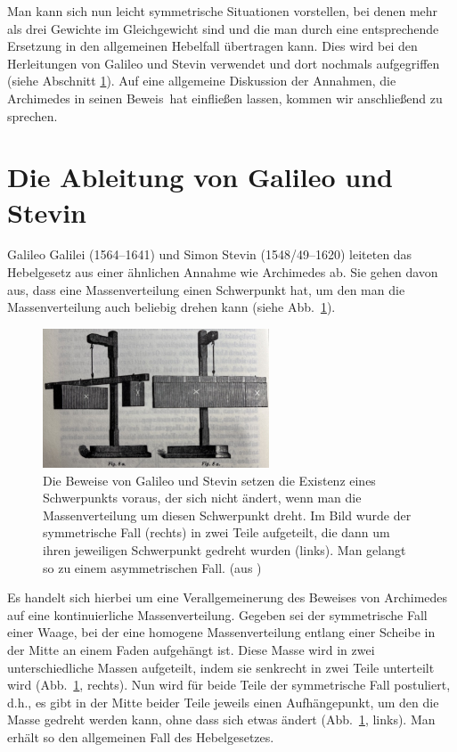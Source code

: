 Man kann sich nun leicht symmetrische Situationen vorstellen, bei denen mehr als
drei Gewichte im Gleichgewicht sind und die man durch eine entsprechende
Ersetzung in den allgemeinen Hebelfall \"ubertragen kann. Dies wird bei den
Herleitungen von Galileo und Stevin verwendet und dort nochmals aufgegriffen
(siehe Abschnitt \ref{sec_Hebel_G}). Auf eine allgemeine Diskussion der Annahmen,
die Archimedes in seinen \glqq Beweis\grqq\ hat einflie\ss en lassen, kommen wir
anschlie\ss end zu sprechen.

\section{Die Ableitung von Galileo und Stevin}
\label{sec_Hebel_G}

Galileo Galilei (1564--1641) 
und Simon Stevin (1548/49--1620) leiteten das
Hebelgesetz aus einer \"ahnlichen Annahme wie Archimedes ab. Sie gehen
davon aus, dass eine Massenverteilung einen Schwerpunkt hat, um den man
die Massenverteilung auch beliebig drehen kann (siehe Abb.\ \ref{fig_Mach}). 

\begin{figure}
\includegraphics[width=0.6\textwidth]{./Bilder/Mach.jpg}
\caption{\label{fig_Mach}%
Die Beweise von Galileo und Stevin setzen die Existenz eines Schwerpunkts voraus,
der sich nicht \"andert, wenn man die Massenverteilung um diesen Schwerpunkt
dreht. Im Bild wurde der symmetrische Fall (rechts) in zwei Teile aufgeteilt, die dann um 
ihren jeweiligen Schwerpunkt gedreht wurden (links). Man gelangt so zu einem asymmetrischen
Fall. (aus \cite{Mach})}
\end{figure}

Es handelt sich hierbei um eine Verallgemeinerung des Beweises von Archimedes
auf eine kontinuierliche Massenverteilung. Gegeben sei der symmetrische Fall
einer Waage, bei der eine homogene Massenverteilung entlang einer Scheibe
in der Mitte an einem Faden aufgeh\"angt ist. Diese Masse wird in
zwei unterschiedliche Massen aufgeteilt, indem sie senkrecht in zwei Teile
unterteilt wird (Abb.\ \ref{fig_Mach}, rechts). Nun wird f\"ur beide Teile der symmetrische
Fall postuliert, d.h., es gibt in der Mitte beider Teile jeweils einen Aufh\"angepunkt,
um den die Masse gedreht werden kann, ohne dass sich etwas \"andert (Abb.\ \ref{fig_Mach}, links). 
Man erh\"alt so den allgemeinen Fall des Hebelgesetzes. 

